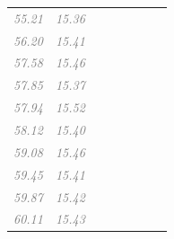 \documentclass[
  letterpaper,
  DIV=11,
  numbers=noendperiod]{scrartcl}
\newcommand{\cmark}{\ding{51}}
\begin{document}
\begin{longtable}[t]{llccccll}
\textcolor{gray}{\em{55.21}} & \textcolor{gray}{\em{15.36}} & \textcolor{gray}{\em{}} & \textcolor{gray}{\em{}} & \textcolor{gray}{\em{\cmark}} & \textcolor{gray}{\em{}} & \textcolor{gray}{\em{\cmark}} & \textcolor{gray}{\em{}}\\
\textcolor{gray}{\em{56.20}} & \textcolor{gray}{\em{15.41}} & \textcolor{gray}{\em{\cmark}} & \textcolor{gray}{\em{}} & \textcolor{gray}{\em{\cmark}} & \textcolor{gray}{\em{}} & \textcolor{gray}{\em{\cmark}} & \textcolor{gray}{\em{}}\\
\addlinespace
\textcolor{gray}{\em{57.58}} & \textcolor{gray}{\em{15.46}} & \textcolor{gray}{\em{}} & \textcolor{gray}{\em{}} & \textcolor{gray}{\em{\cmark}} & \textcolor{gray}{\em{\cmark}} & \textcolor{gray}{\em{\cmark}} & \textcolor{gray}{\em{\cmark}}\\
\textcolor{gray}{\em{57.85}} & \textcolor{gray}{\em{15.37}} & \textcolor{gray}{\em{\cmark}} & \textcolor{gray}{\em{}} & \textcolor{gray}{\em{}} & \textcolor{gray}{\em{\cmark}} & \textcolor{gray}{\em{\cmark}} & \textcolor{gray}{\em{\cmark}}\\
\textcolor{gray}{\em{57.94}} & \textcolor{gray}{\em{15.52}} & \textcolor{gray}{\em{\cmark}} & \textcolor{gray}{\em{}} & \textcolor{gray}{\em{}} & \textcolor{gray}{\em{\cmark}} & \textcolor{gray}{\em{\cmark}} & \textcolor{gray}{\em{}}\\
\textcolor{gray}{\em{58.12}} & \textcolor{gray}{\em{15.40}} & \textcolor{gray}{\em{\cmark}} & \textcolor{gray}{\em{}} & \textcolor{gray}{\em{\cmark}} & \textcolor{gray}{\em{\cmark}} & \textcolor{gray}{\em{\cmark}} & \textcolor{gray}{\em{\cmark}}\\
\textcolor{gray}{\em{59.08}} & \textcolor{gray}{\em{15.46}} & \textcolor{gray}{\em{\cmark}} & \textcolor{gray}{\em{}} & \textcolor{gray}{\em{\cmark}} & \textcolor{gray}{\em{}} & \textcolor{gray}{\em{\cmark}} & \textcolor{gray}{\em{\cmark}}\\
\addlinespace
\textcolor{gray}{\em{59.45}} & \textcolor{gray}{\em{15.41}} & \textcolor{gray}{\em{}} & \textcolor{gray}{\em{}} & \textcolor{gray}{\em{}} & \textcolor{gray}{\em{}} & \textcolor{gray}{\em{\cmark}} & \textcolor{gray}{\em{}}\\
\textcolor{gray}{\em{59.87}} & \textcolor{gray}{\em{15.42}} & \textcolor{gray}{\em{\cmark}} & \textcolor{gray}{\em{}} & \textcolor{gray}{\em{}} & \textcolor{gray}{\em{}} & \textcolor{gray}{\em{\cmark}} & \textcolor{gray}{\em{}}\\
\textcolor{gray}{\em{60.11}} & \textcolor{gray}{\em{15.43}} & \textcolor{gray}{\em{}} & \textcolor{gray}{\em{}} & \textcolor{gray}{\em{\cmark}} & \textcolor{gray}{\em{}} & \textcolor{gray}{\em{\cmark}} & \textcolor{gray}{\em{\cmark}}\\

\end{longtable}
\end{document}
